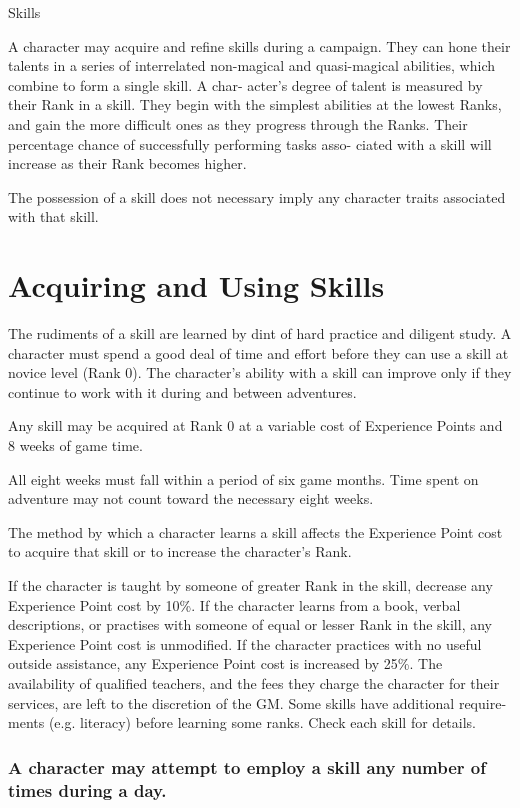 \begin{Chapter}{Skills}

A character may acquire and refine skills during a campaign. They can
hone their talents in a series of interrelated non-magical and
quasi-magical abilities, which combine to form a single skill. A char-
acter’s degree of talent is measured by their Rank in a skill. They
begin with the simplest abilities at the lowest Ranks, and gain the
more difficult ones as they progress through the Ranks. Their
percentage chance of successfully performing tasks asso- ciated with a
skill will increase as their Rank becomes higher.

The possession of a skill does not necessary imply any character
traits associated with that skill.

\section{Acquiring and Using Skills}

The rudiments of a skill are learned by dint of hard practice and
diligent study. A character must spend a good deal of time and effort
before they can use a skill at novice level (Rank 0).  The character’s
ability with a skill can improve only if they continue to work with it
during and between adventures.

Any skill may be acquired at Rank 0 at a variable cost of Experience
Points and 8 weeks of game time.

All eight weeks must fall within a period of six game months.  Time
spent on adventure may not count toward the necessary eight weeks.

The method by which a character learns a skill affects the Experience
Point cost to acquire that skill or to increase the character’s Rank.

If the character is taught by someone of greater Rank in the skill,
decrease any Experience Point cost by 10\%.  If the character learns
from a book, verbal descriptions, or practises with someone of equal
or lesser Rank in the skill, any Experience Point cost is
unmodified. If the character practices with no useful outside
assistance, any Experience Point cost is increased by 25\%. The
availability of qualified teachers, and the fees they charge the
character for their services, are left to the discretion of the GM.
Some skills have additional require- ments (e.g.  literacy) before
learning some ranks.  Check each skill for details.

\subsubsection{A character may attempt to employ a skill any number of times during a
day.}


\end{Chapter}
